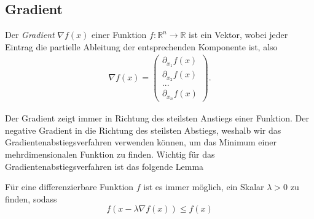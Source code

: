 \subsection{Gradient}
\begin{Def}
Der \emph{Gradient} $\nabla f(x)$ einer Funktion $f:\mathbb{R}^n\rightarrow \mathbb{R}$ ist ein Vektor, wobei jeder Eintrag die partielle Ableitung der entsprechenden Komponente ist, also
\begin{equation*} \begin{split} \nabla f(x) = \left( \begin{array}{c}
\partial_{x_1} f(x) \\
\partial_{x_2} f(x) \\
... \\
\partial_{x_n} f(x)
\end{array}
\right).
\end{split} \end{equation*} 
\end{Def}

Der Gradient zeigt immer in Richtung des steilsten Anstiegs einer Funktion. Der negative Gradient in die Richtung des steilsten Abstiegs, weshalb wir das Gradientenabstiegsverfahren verwenden können, um das Minimum einer mehrdimensionalen Funktion zu finden. Wichtig für das Gradientenabstiegsverfahren ist das folgende Lemma

\begin{Lem}
\label{lem:gradientabstieg}
F\"ur eine differenzierbare Funktion $f$ ist es immer m\"oglich, ein Skalar $\lambda>0$ zu finden, sodass
\begin{equation}
\label{lambda-ungleichung}
f(x - \lambda \nabla f(x)) \leq f(x)
\end{equation} 
\end{Lem}


